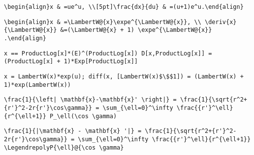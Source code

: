 \newsavebox\AJT
\begin{lrbox}{\AJT}
 \begin{minipage}[t]{0.82\textwidth}
  \lstinline[language={[latex]TeX},mathescape,breaklines=true]"\begin{align}x & =ue^u, \\[5pt]\frac{dx}{du} & =(u+1)e^u.\end{align}"
 \end{minipage}
\end{lrbox}
\newsavebox\AJST
\begin{lrbox}{\AJST}
 \begin{minipage}[t]{0.82\textwidth}
  \lstinline[language={[latex]TeX},mathescape,breaklines=true]"\begin{align}x & =\LambertW@{x}\expe^{\LambertW@{x}}, \\ \deriv{x}{\LambertW@{x}} &=(\LambertW@{x} + 1) \expe^{\LambertW@{x}} .\end{align}"
 \end{minipage}
\end{lrbox}
\newsavebox\AJMM
\begin{lrbox}{\AJMM}
 \begin{minipage}[t]{0.82\textwidth}
  \lstinline[language={[latex]TeX},mathescape,breaklines=true]"x == ProductLog[x]*(E)^(ProductLog[x]) D[x,ProductLog[x]] = (ProductLog[x] + 1)*Exp[ProductLog[x]]"
 \end{minipage}
\end{lrbox}
\newsavebox\AJMA
\begin{lrbox}{\AJMA}
 \begin{minipage}[t]{0.82\textwidth}
  \lstinline[language={[latex]TeX},mathescape,breaklines=true]"x = LambertW(x)*exp(u); diff(x, [LambertW(x)$\$$1]) = (LambertW(x) + 1)*exp(LambertW(x))"
 \end{minipage}
\end{lrbox}
\newsavebox\AKT
\begin{lrbox}{\AKT}
 \begin{minipage}[t]{0.82\textwidth}
  \lstinline[language={[latex]TeX},mathescape,breaklines=true]"\frac{1}{\left| \mathbf{x}-\mathbf{x}' \right|} = \frac{1}{\sqrt{r^2+{r'}^2-2r{r'}\cos\gamma}} = \sum_{\ell=0}^\infty \frac{{r'}^\ell}{r^{\ell+1}} P_\ell(\cos \gamma)"
 \end{minipage}
\end{lrbox}
\newsavebox\AKST
\begin{lrbox}{\AKST}
 \begin{minipage}[t]{0.82\textwidth}
  \lstinline[language={[latex]TeX},mathescape,breaklines=true]"\frac{1}{|\mathbf{x} - \mathbf{x} '|} = \frac{1}{\sqrt{r^2+{r'}^2-2r{r'}\cos\gamma}} = \sum_{\ell=0}^\infty \frac{{r'}^\ell}{r^{\ell+1}} \LegendrepolyP{\ell}@{\cos \gamma}"
 \end{minipage}
\end{lrbox}
